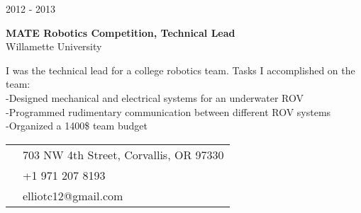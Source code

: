 \documentclass[10pt]{article} %
\begin{document}
{\begin{minipage}[t]{0.5\textwidth}

{\raggedleft\textsc{2012 - 2013}\par}

{\raggedright\large \textbf{MATE Robotics Competition, Technical Lead}\\
{Willamette University}\\[5pt]}
\normalsize{I was the technical lead for a college robotics team. Tasks I accomplished on the team:}\\
\hspace*{0.2in}-Designed mechanical and electrical systems for an underwater ROV\\
\hspace*{0.2in}-Programmed rudimentary communication between different ROV systems\\
\hspace*{0.2in}-Organized a 1400\$ team budget\\




\end{minipage} %
\hfill
\begin{minipage}[t]{0.44\textwidth} %
\vspace{0pt} %


\colorbox{shade}{\textcolor{text1}{
\begin{tabular}{c|p{7cm}}
\raisebox{-4pt}{\textifsymbol{18}} & 703 NW 4th Street, Corvallis, OR 97330\\ %
\raisebox{-3pt}{\Mobilefone} & +1 971 207 8193\\ %
\raisebox{-1pt}{\Letter} & elliotc12@gmail.com \\ %
\end{tabular}
}
}\\[10pt]



\end{minipage}}
\end{document}

